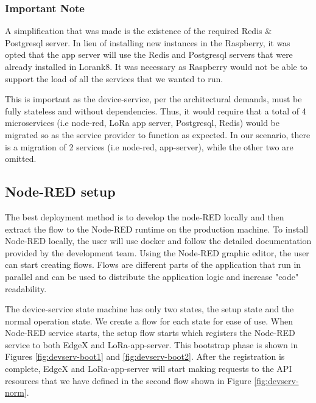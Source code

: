 \subsubsection{Important Note}
A simplification that was made is the existence of the required Redis \& Postgresql server. In lieu of installing new instances in the Raspberry, it was opted that the app server will use the Redis and Postgresql servers that were already installed in Lorank8. It was necessary as Raspberry would not be able to support the load of all the services that we wanted to run.

This is important as the device-service, per the architectural demands, must be fully stateless and without dependencies. Thus, it would require that a total of 4 microservices (i.e node-red, LoRa app server, Postgresql, Redis) would be migrated so as the service provider to function as expected. In our scenario, there is a migration of 2 services (i.e node-red, app-server), while the other two are omitted. 

\subsection{Node-RED setup}
The best deployment method is to develop the node-RED locally and then extract the flow to the Node-RED runtime on the production machine. To install Node-RED locally, the user will use docker and follow the detailed documentation\cite{nodered-docker} provided by the development team. Using the Node-RED graphic editor, the user can start creating flows. Flows are different parts of the application that run in parallel and can be used to distribute the application logic and increase "code" readability.

The device-service state machine has only two states, the setup state and the normal operation state. We create a flow for each state for ease of use. When Node-RED service starts, the setup flow starts which registers the Node-RED service to both EdgeX and LoRa-app-server. This bootstrap phase is shown in Figures \ref{fig:devserv-boot1} and \ref{fig:devserv-boot2}. After the registration is complete, EdgeX and LoRa-app-server will start making requests to the API resources that we have defined in the second flow shown in Figure \ref{fig:devserv-norm}.

